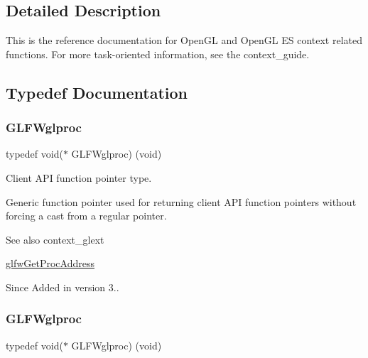 \subsection{Detailed Description}
This is the reference documentation for Open\+GL and Open\+GL ES context related functions. For more task-\/oriented information, see the context\+\_\+guide. 

\subsection{Typedef Documentation}
\mbox{\label{group__context_ga3d47c2d2fbe0be9c505d0e04e91a133c}} 
\subsubsection{\texorpdfstring{G\+L\+F\+Wglproc}{GLFWglproc}\hspace{0.1cm}{\footnotesize\ttfamily [1/5]}}
{\footnotesize\ttfamily typedef void($\ast$ G\+L\+F\+Wglproc) (void)}



Client A\+PI function pointer type. 

Generic function pointer used for returning client A\+PI function pointers without forcing a cast from a regular pointer.

\begin{DoxySeeAlso}{See also}
context\+\_\+glext 

\hyperlink{group__context_ga0e8af175218929615c16e74938c10f2a}{glfw\+Get\+Proc\+Address}
\end{DoxySeeAlso}
\begin{DoxySince}{Since}
Added in version 3.. 
\end{DoxySince}
\mbox{\label{group__context_ga3d47c2d2fbe0be9c505d0e04e91a133c}} 
\subsubsection{\texorpdfstring{G\+L\+F\+Wglproc}{GLFWglproc}\hspace{0.1cm}{\footnotesize\ttfamily [2/5]}}
{\footnotesize\ttfamily typedef void($\ast$ G\+L\+F\+Wglproc) (void)}



